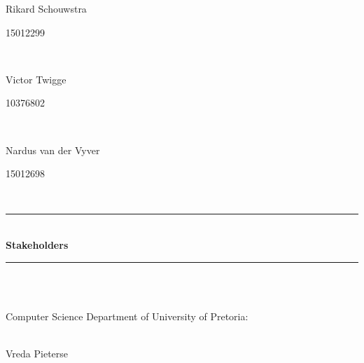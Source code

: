 \begin{titlepage}
\begin{center}
		\begin{minipage}{0.4\textwidth}
			\begin{flushleft} \large
				Rikard Schouwstra
			\end{flushleft}
		\end{minipage}
		\begin{minipage}{0.4\textwidth}
			\begin{flushright} \large
				15012299
			\end{flushright}
		\end{minipage} \\[0.2cm]
		
		\begin{minipage}{0.4\textwidth}
			\begin{flushleft} \large
				Victor Twigge 
			\end{flushleft}
		\end{minipage}
		\begin{minipage}{0.4\textwidth}
			\begin{flushright} \large
				10376802
			\end{flushright}
		\end{minipage}\\[0.2cm]
		
		\begin{minipage}{0.4\textwidth}
			\begin{flushleft} \large
				Nardus van der Vyver 
			\end{flushleft}
		\end{minipage}
		\begin{minipage}{0.4\textwidth}
			\begin{flushright} \large
				15012698
			\end{flushright}
		\end{minipage} \\[0.2cm]
		
		\rule{\linewidth}{0.5mm} \\[0.5cm] 
		{ \huge \bfseries Stakeholders}\\[0.3cm]	
		\rule{\linewidth}{0.2mm} \\[0.5cm] 
		\begin{minipage}{0.4\textwidth}
			\begin{flushleft} \large
				\emph{} \\
				Computer Science Department of University of Pretoria:
			\end{flushleft}
		\end{minipage}
		\begin{minipage}{0.4\textwidth}
			\begin{flushright} \large
				\emph{} \\
				Vreda Pieterse
			\end{flushright}
		\end{minipage}\\[0.2cm]


\end{center}
\end{titlepage}

